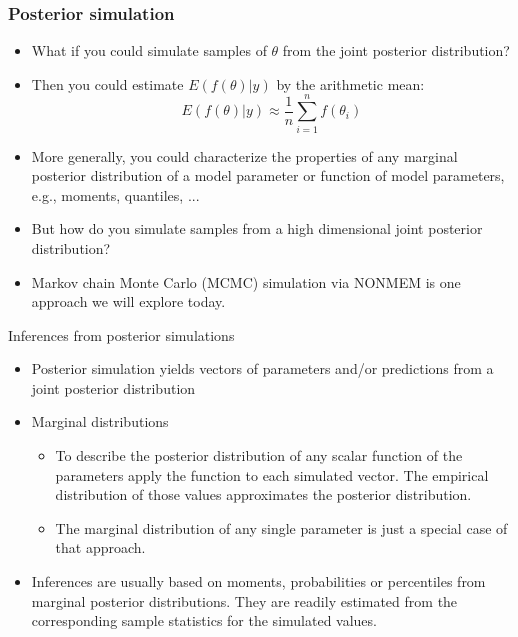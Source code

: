 \documentclass{beamer}
\begin{document}
\begin{frame}
  \frametitle{Posterior simulation}

  \begin{itemize}
  \item What if you could simulate samples of $\theta$ from the joint
    posterior distribution?
  \item Then you could estimate
    $E\left(f\left(\theta\right)|y\right)$ by the arithmetic mean:
$$E\left(f\left(\theta\right)|y\right) \approx \frac{1}{n}
\sum_{i=1}^n f\left(\theta_i\right)$$
\item More generally, you could characterize the properties of any
  marginal posterior distribution of a model parameter or function of
  model parameters, e.g., moments, quantiles, ...
\item But how do you simulate samples from a high dimensional joint
  posterior distribution?
\item Markov chain Monte Carlo (MCMC) simulation via NONMEM is one
  approach we will explore today.
\end{itemize}

\end{frame}

\begin{frame}{Inferences from posterior simulations}

  \begin{itemize}
  \item Posterior simulation yields vectors of parameters and/or
    predictions from a joint posterior distribution
  \item Marginal distributions
    \begin{itemize}
    \item To describe the posterior distribution of any scalar
      function of the parameters apply the function to each simulated
      vector. The empirical distribution of those values approximates
      the posterior distribution.
    \item The marginal distribution of any single parameter is just a
      special case of that approach.
    \end{itemize}
  \item Inferences are usually based on moments, probabilities or
    percentiles from marginal posterior distributions. They are
    readily estimated from the corresponding sample statistics for the
    simulated values.
  \end{itemize}

\end{frame}
\end{document}
